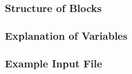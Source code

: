 \vspace{5mm}
\subsubsection{Structure of Blocks}



\vspace{5mm}
\subsubsection{Explanation of Variables}
\begin{description}

\end{description}

\vspace{5mm}
\subsubsection{Example Input File}


